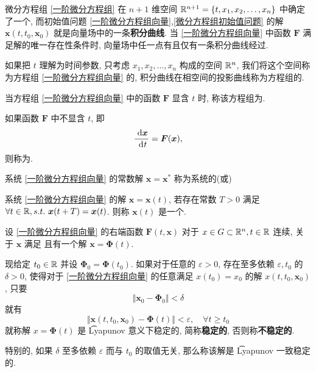 \begin{definition}
	微分方程组 \eqref{一阶微分方程组} 在 $n+1$ 维空间 $\mathbb R^{n+1}=\{t,x_1,x_2,\ldots,x_n\}$ 中确定了一个, 而初始值问题 \eqref{一阶微分方程组向量},\eqref{微分方程组初始值问题} 的解 $\bm x(t,t_0,\bm x_0)$ 就是向量场中的一条\textbf{积分曲线}. 当 \eqref{一阶微分方程组向量} 中函数 $\bm F$ 满足解的唯一存在性条件时, 向量场中任一点有且仅有一条积分曲线经过.
\end{definition}

\begin{definition}
	如果把 $t$ 理解为时间参数, 只考虑 $x_1,x_2,\ldots,x_n$ 构成的空间 $\mathbb R^n$, 我们将这个空间称为方程组 \eqref{一阶微分方程组向量} 的, 积分曲线在相空间的投影曲线称为方程组的.
\end{definition}

\begin{definition}
	当方程组 \eqref{一阶微分方程组向量} 中的函数 $\bm F$ 显含 $t$ 时, 称该方程组为.

	如果函数 $\bm F$ 中不显含 $t$, 即 \begin{equation}
		\dfrac{\ \text {d} \bm x^{}}{\ \text {d}^{} t}=\bm F(\bm x),
	\end{equation}
	则称为.
\end{definition}

\begin{definition}
	系统 \eqref{一阶微分方程组向量} 的常数解 $\bm x=\bm x^*$ 称为系统的(或)
\end{definition}

\begin{definition}
	系统 \eqref{一阶微分方程组向量} 的解 $\bm x=\bm x(t)$, 若存在常数 $T>0$ 满足 $\forall t\in\mathbb R,s.t.\ \bm x(t+T)=\bm x(t)$. 则称 $\bm x(t)$ 是一个.
\end{definition}

\begin{definition}
	设 \eqref{一阶微分方程组向量} 的右端函数 $\bm F(t,\bm x)$ 对于 $x\in G\subset\mathbb R^n,t\in \mathbb R$ 连续, 关于 $\bm x$ 满足 \hyperref[lpxc条件]{\lpxc}且有一个解 $\bm x=\bm\Phi(t)$.

	现给定 $t_0\in\mathbb R$ 并设 $\bm\Phi_0=\bm\Phi(t_0)$. 如果对于任意的 $\varepsilon>0$, 存在至多依赖 $\varepsilon,t_0$ 的 $\delta>0$, 使得对于 \eqref{一阶微分方程组向量} 的任意满足 $x(t_0)=x_0$ 的解 $x(t,t_0,\bm x_0)$, 只要 \begin{equation}
		\Vert \bm x_0-\bm \Phi_0\Vert<\delta
	\end{equation}
	就有\begin{equation}
		\Vert \bm x(t,t_0,\bm x_0)-\bm\Phi(t)\Vert<\varepsilon,\quad \forall t\geqslant t_0
	\end{equation}
	就称解 $x=\bm\Phi(t)$ 是 \t{Lyapunov} 意义下稳定的, 简称\textbf{稳定的}, 否则称\textbf{不稳定的}.

	特别的, 如果 $\delta$ 至多依赖 $\varepsilon$ 而与 $t_0$ 的取值无关, 那么称该解是 \t{Lyapunov} 一致稳定的.
\end{definition}

